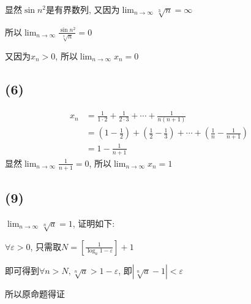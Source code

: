 \documentclass[a4paper,11pt]{article}
\begin{document}
显然$\sin n^2$是有界数列, 又因为$\displaystyle \lim_{n\rightarrow \infty} \sqrt[3]{n} = \infty$

所以$\displaystyle \lim_{n\rightarrow \infty}\frac{\sin n^2}{\sqrt[3]{n}} = 0$

又因为$x_n > 0$, 所以$\displaystyle \lim_{n\rightarrow \infty}x_n=0$
\subsection*{(6)}
\begin{align*}
	x_n&=\frac{1}{1\cdot2}+\frac{1}{2\cdot3}+\cdots+\frac{1}{n(n+1)}\\
	&=(1-\frac{1}{2})+(\frac{1}{2}-\frac{1}{3})+\cdots+(\frac{1}{n}-\frac{1}{n+1})\\
	&=1-\frac{1}{n+1}
\end{align*}
显然$\displaystyle \lim_{n\rightarrow \infty}\frac{1}{n+1}=0$, 所以$\displaystyle \lim_{n\rightarrow \infty}x_n=1$
\subsection*{(9)}
$\displaystyle \lim_{n\rightarrow \infty}\sqrt[n]{a}=1$, 证明如下:

$\forall \varepsilon > 0$, 只需取$N = [\frac{1}{\log_a{1-\varepsilon}}]+1$

即可得到$\forall n > N, \sqrt[n]{a} > 1-\varepsilon$, 即$|\sqrt[n]{a} - 1| < \varepsilon$

所以原命题得证
\end{document}
